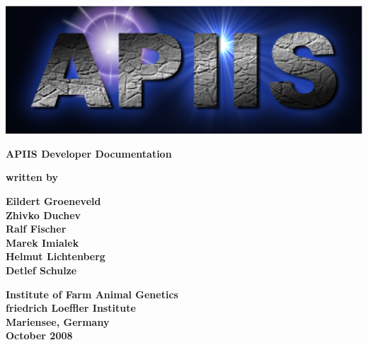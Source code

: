 \documentclass[10pt,a4paper]{book}
\begin{document}
\begin{center}
\includegraphics[scale=.7,]{../implementer/apiis6.ps}

\vspace{2cm}
\begin{Huge}\textbf{APIIS Developer Documentation}\end{Huge}
\vspace{1cm}

\begin{Large}\textbf{written by}
\vspace{1cm}

\textbf{Eildert Groeneveld\\
        Zhivko Duchev\\
        Ralf Fischer\\
        Marek Imialek\\
        Helmut Lichtenberg\\
        Detlef Schulze\\}\end{Large}
\vspace{2cm}

 \begin{large}\textbf{Institute of Farm Animal Genetics\\
                      friedrich Loeffler Institute\\
                      Mariensee, Germany\\
                      October 2008}\end{large}
\end{center}
 \newenvironment{lyxcode}
    {\begin{list}{}{
     \setlength{\rightmargin}{\leftmargin}
     \listparindent}{0pt}%
                                   AMS classes
     \raggedright
     \setlength{\itemsep}{0pt}
     \setlength{\parsep}{0pt}
     \normalfont\ttfamily}%
     {\end{list}}
\end{document}
